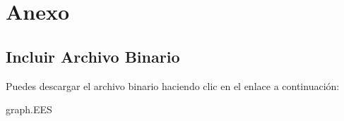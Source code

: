 \newpage
\section{Anexo}

\subsection{Incluir Archivo Binario}

Puedes descargar el archivo binario haciendo clic en el enlace a continuación:


graph.EES
